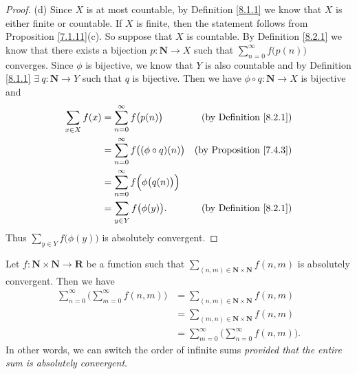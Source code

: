 \begin{proof}{(d)}
    Since \(X\) is at most countable, by Definition \ref{8.1.1} we know that \(X\) is either finite or countable.
    If \(X\) is finite, then the statement follows from Proposition \ref{7.1.11}(c).
    So suppose that \(X\) is countable.
    By Definition \ref{8.2.1} we know that there exists a bijection \(p : \mathbf{N} \to X\) such that \(\sum_{n = 0}^\infty f\big(p(n)\big)\) converges.
    Since \(\phi\) is bijective, we know that \(Y\) is also countable and by Definition \ref{8.1.1} \(\exists\ q : \mathbf{N} \to Y\) such that \(q\) is bijective.
    Then we have \(\phi \circ q : \mathbf{N} \to X\) is bijective and
    \begin{align*}
        \sum_{x \in X} f(x) & = \sum_{n = 0}^\infty f\big(p(n)\big)               & \text{(by Definition \ref{8.2.1})}  \\
                            & = \sum_{n = 0}^\infty f\big((\phi \circ q)(n)\big)  & \text{(by Proposition \ref{7.4.3})} \\
                            & = \sum_{n = 0}^\infty f\Big(\phi\big(q(n)\big)\Big)                                       \\
                            & = \sum_{y \in Y} f\big(\phi(y)\big).                & \text{(by Definition \ref{8.2.1})}
    \end{align*}
    Thus \(\sum_{y \in Y} f\big(\phi(y)\big)\) is absolutely convergent.
\end{proof}

\begin{theorem}\label{8.2.2}
    Let \(f : \mathbf{N} \times \mathbf{N} \to \mathbf{R}\) be a function such that \(\sum_{(n, m) \in \mathbf{N} \times \mathbf{N}} f(n, m)\) is absolutely convergent.
    Then we have
    \begin{align*}
        \sum_{n = 0}^\infty \bigg(\sum_{m = 0}^\infty f(n, m)\bigg) & = \sum_{(n, m) \in \mathbf{N} \times \mathbf{N}} f(n, m)       \\
                                                                    & = \sum_{(m, n) \in \mathbf{N} \times \mathbf{N}} f(n, m)       \\
                                                                    & = \sum_{m = 0}^\infty \bigg(\sum_{n = 0}^\infty f(n, m)\bigg).
    \end{align*}
    In other words, we can switch the order of infinite sums \emph{provided that the entire sum is absolutely convergent}.
\end{theorem}

